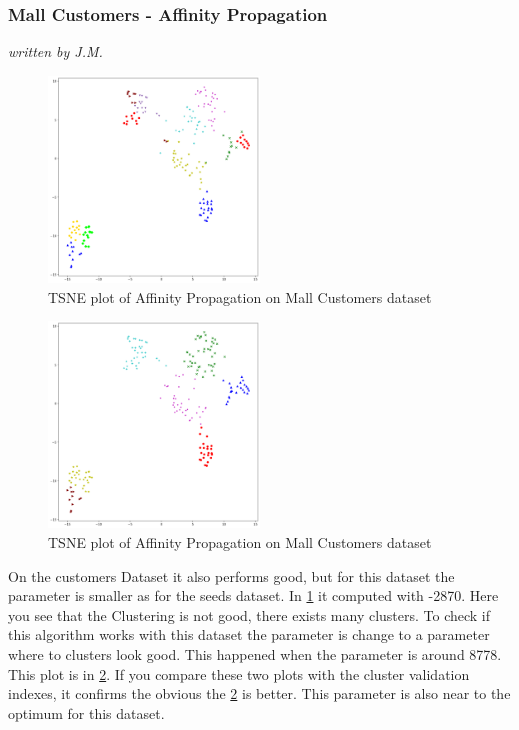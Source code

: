 \subsubsection{Mall Customers - Affinity Propagation}
\textit{written by J.M.}\\

 \begin{figure}[!ht]
 	\caption{TSNE plot of Affinity Propagation on Mall Customers dataset}
 	\begin{center}
 		\includegraphics[width=0.5\textwidth]{images/af_mallcustomers2870.png}
 	\end{center}
 	\label{fig:af_mall1}
 \end{figure}
 
 \begin{figure}[!ht]
 	\caption{TSNE plot of Affinity Propagation on Mall Customers dataset}
 		\begin{center}
 			\includegraphics[width=0.5\textwidth]{images/af_mallcustomers8778.png}
 		\end{center}
 		\label{fig:af_mall2}
 	\end{figure}
 
On the customers Dataset it also performs good, but for this dataset the parameter is smaller as for the seeds dataset. In \ref{fig:af_mall1} it computed with -2870. Here you see that the Clustering is not good, there exists many clusters. To check if this algorithm works with this dataset the parameter is change to a parameter where to clusters look good. This happened when the parameter is around 8778. This plot is in \ref{fig:af_mall2}. If you compare these two plots with the cluster validation indexes, it confirms the obvious the \ref{fig:af_mall2} is better. This parameter is also near to the optimum for this dataset. 

